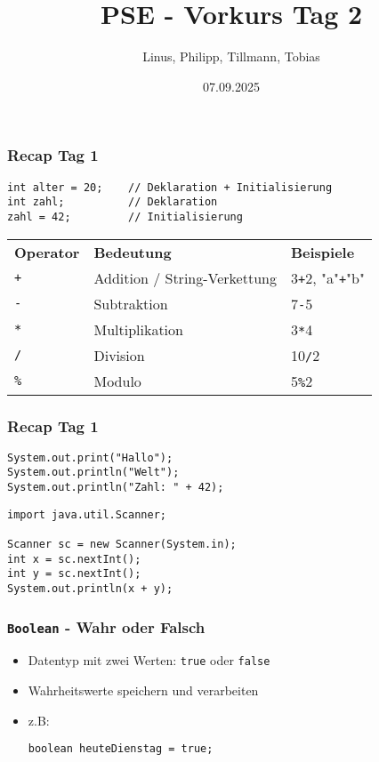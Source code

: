 \documentclass{../../presentation}
\title{PSE - Vorkurs Tag 2}
\author{Linus, Philipp, Tillmann, Tobias}
\institute{FIUS - Fachgruppe Informatik Universität Stuttgart}
\date{07.09.2025}
\begin{document}
\begin{frame}
  \titlepage
\end{frame}

\begin{frame}[fragile]
  \frametitle{Recap Tag 1}
  \pause
  \begin{center}
    \begin{verbatim}
int alter = 20;    // Deklaration + Initialisierung
int zahl;          // Deklaration
zahl = 42;         // Initialisierung
    \end{verbatim}

    \pause
    \begin{tabular}{l l l}
      \rowcolor{tablehead}
      \textbf{Operator} & \textbf{Bedeutung}           & \textbf{Beispiele}              \\
      \texttt{+}        & Addition / String-Verkettung & 3\texttt{+}2, "a"\texttt{+}"b"  \\
      \texttt{-}        & Subtraktion                  & 7\texttt{-}5                    \\
      \texttt{*}        & Multiplikation               & 3\texttt{*}4                    \\
      \texttt{/}        & Division                     & 10\texttt{/}2                   \\
      \texttt{\%}       & Modulo                       & 5\texttt{\%}2                   \\
    \end{tabular}
  \end{center}
\end{frame}


\begin{frame}[fragile]
  \frametitle{Recap Tag 1}
  \pause
  \begin{verbatim}
System.out.print("Hallo");
System.out.println("Welt");
System.out.println("Zahl: " + 42);
  \end{verbatim}
  \pause
  \begin{verbatim}
import java.util.Scanner;

Scanner sc = new Scanner(System.in);
int x = sc.nextInt();
int y = sc.nextInt();
System.out.println(x + y);
  \end{verbatim}
\end{frame}


\begin{frame}[fragile]
  \frametitle{\texttt{Boolean} - Wahr oder Falsch}
  \pause
  \begin{itemize}
    \item Datentyp mit zwei Werten: \texttt{true} oder \texttt{false}
          \pause
    \item Wahrheitswerte speichern und verarbeiten
          \pause
    \item z.B:
          \begin{verbatim}
boolean heuteDienstag = true;
    \end{verbatim}

  \end{itemize}
\end{frame}
\end{document}
